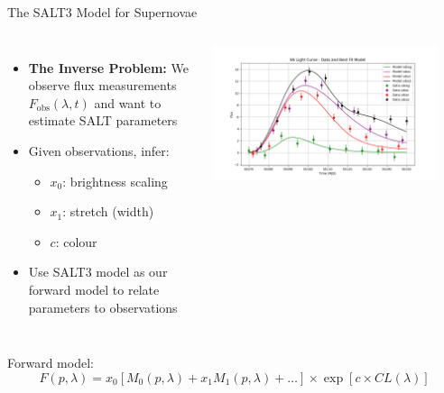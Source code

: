 \documentclass[aspectratio=169]{beamer}
\begin{document}
\begin{frame}{The SALT3 Model for Supernovae}
  \begin{columns}
      \begin{itemize}
        \item \textbf{The Inverse Problem:} We observe flux measurements $F_{\text{obs}}(\lambda, t)$ and want to estimate SALT parameters
        \item Given observations, infer:
          \begin{itemize}
            \item $x_0$: brightness scaling
            \item $x_1$: stretch (width)
            \item $c$: colour
          \end{itemize}
        \item Use SALT3 model as our forward model to relate parameters to observations
      \end{itemize}
      \centering
      \includegraphics[width=0.9\textwidth]{images/sncosmo-fitter.png}
  \end{columns}
  \vfill
  \centering
  Forward model:
  \begin{equation*}
    F(p, \lambda) = x_0 \left[M_0(p, \lambda) + x_1M_1(p, \lambda) + \dots\right] \times \exp \left[c \times CL(\lambda)\right]
  \end{equation*}
\end{frame}
\end{document}
